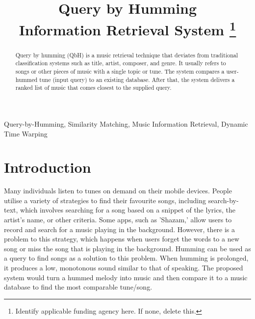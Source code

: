 \documentclass[conference]{IEEEtran}
\begin{document}
\title{Query by Humming\\
{\footnotesize \textsuperscript {}Information Retrieval System}
\thanks{Identify applicable funding agency here. If none, delete this.}
}

\author{
\and
{}
\and
{}

}

\maketitle

\begin{abstract}
Query by humming (QbH) is a music retrieval technique that deviates from traditional classification systems such as title, artist, composer, and genre. It usually refers to songs or other pieces of music with a single topic or tune. The system compares a user-hummed tune (input query) to an existing database. After that, the system delivers a ranked list of music that comes closest to the supplied query.\cite{b1}
\end{abstract}

\begin{IEEEkeywords}
Query-by-Humming, Similarity Matching, Music Information Retrieval, Dynamic Time Warping
\end{IEEEkeywords}

\section{Introduction}
Many individuals listen to tunes on demand on their mobile devices. People utilise a variety of strategies to find their favourite songs, including search-by-text, which involves searching for a song based on a snippet of the lyrics, the artist's name, or other criteria. 
Some apps, such as 'Shazam,' allow users to record and search for a music playing in the background. However, there is a problem to this strategy, which happens when users forget the words to a new song or miss the song that is playing in the background. Humming can be used as a query to find songs as a solution to this problem. When humming is prolonged, it produces a low, monotonous sound similar to that of speaking. The proposed system would turn a hummed melody into music and then compare it to a music database to find the most comparable tune/song.
\end{document}
